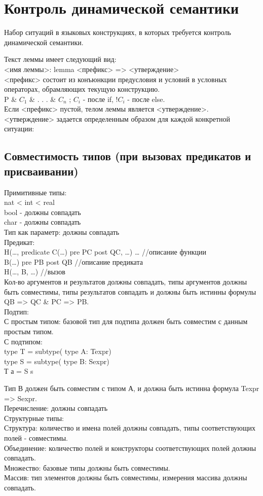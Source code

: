 \documentclass[12pt,a4paper]{article}
\begin{document}
\section{Контроль динамической семантики}
Набор ситуаций в языковых конструкциях, в которых требуется контроль динамической семантики.

Текст леммы имеет следующий вид: \\
<имя леммы>: lemma <префикс> => <утверждение> \\
<префикс> состоит из конъюнкции предусловия и условий в условных операторах, обрамляющих текущую конструкцию. \\
P \& $C_1$ \& . . . \& $C_n$ ; $C_i$ - после if, !$C_i$ - после else. \\
Если <префикс>  пустой, телом леммы является <утверждение>.\\
<утверждение> задается определенным образом для каждой конкретной ситуации:

\subsection{Совместимость типов (при вызовах предикатов и присваивании)}

Примитивные типы: \\
nat < int < real \\
bool - должны совпадать \\
char - должны совпадать \\
Тип как параметр:  должны совпадать \\
Предикат: \\
H(…, predicate C(…) pre PC post QC, …) {…} //описание функции \\
B(…) pre PB post QB //описание предиката \\
H(…, B, …) //вызов \\
Кол-во аргументов и результатов должны совпадать, типы аргументов должны быть совместимы, типы результатов совпадать и должны быть истинны формулы QB => QC \& PC => PB. \\
Подтип: \\
С простым типом: базовой тип для подтипа должен быть совместим с данным простым типом. \\
С подтипом: \\
type T = subtype( type A: Texpr) \\
type S = subtype( type B: Sexpr) \\
Т а = S s 

Тип В должен быть совместим с типом А, и должна быть истинна формула Texpr => Sexpr. \\
Перечисление: должны совпадать \\
Структурные типы: \\
Структура: количество и имена полей должны совпадать, типы соответствующих полей - совместимы. \\
Объединение: количество полей и конструкторы соответствующих полей должны совпадать. \\
Множество: базовые типы должны быть совместимы. \\
Массив: тип элементов должны быть совместимы, измерения массива должны совпадать. 
\end{document}
